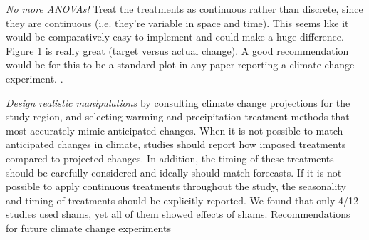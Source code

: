 \documentclass{article}
\begin{document}
\par\textit{No more ANOVAs!} Treat the treatments as continuous rather than discrete, since they are continuous (i.e. they're variable in space and time). This seems like it would be comparatively easy to implement and could make a huge difference. Figure 1 is really great (target versus actual change). A good recommendation would be for this to be a standard plot in any paper reporting a climate change experiment.
. 
\par\textit{Design realistic manipulations} by consulting climate change projections for the study region, and selecting warming and precipitation treatment methods that most accurately mimic anticipated changes. When it is not possible to match anticipated changes in climate, studies should report how imposed treatments compared to projected changes. In addition, the timing of these treatments should be carefully considered and ideally should match forecasts. If it is not possible to apply continuous treatments throughout the study, the seasonality and timing of treatments should be explicitly reported. We found that only 4/12 studies used shams, yet all of them showed effects of shams. Recommendations for future climate change experiments
\end{document}

